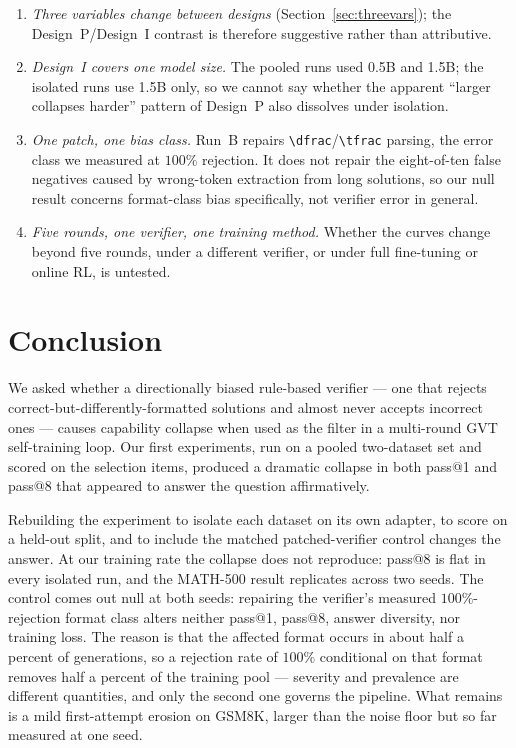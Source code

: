 \documentclass[runningheads]{llncs}
\begin{document}
\begin{enumerate}
points --- including the entire A-versus-B gap --- are below the resolution
of this setup.
\item \emph{Three variables change between designs}
(Section~\ref{sec:threevars}); the Design~P/Design~I contrast is therefore
suggestive rather than attributive.
\item \emph{Design~I covers one model size.} The pooled runs used 0.5B and
1.5B; the isolated runs use 1.5B only, so we cannot say whether the
apparent ``larger collapses harder'' pattern of Design~P also dissolves
under isolation.
\item \emph{One patch, one bias class.} Run~B repairs
\verb|\dfrac|/\verb|\tfrac| parsing, the error class we measured at $100\%$
rejection. It does not repair the eight-of-ten false negatives caused by
wrong-token extraction from long solutions, so our null result concerns
format-class bias specifically, not verifier error in general.
\item \emph{Five rounds, one verifier, one training method.} Whether the
curves change beyond five rounds, under a different verifier, or under full
fine-tuning or online RL, is untested.
\end{enumerate}

\section{Conclusion}
\label{sec:conclusion}

We asked whether a directionally biased rule-based verifier --- one that
rejects correct-but-differently-formatted solutions and almost never
accepts incorrect ones --- causes capability collapse when used as the
filter in a multi-round GVT self-training loop. Our first experiments, run
on a pooled two-dataset set and scored on the selection items, produced a
dramatic collapse in both pass@1 and pass@8 that appeared to answer the
question affirmatively.

Rebuilding the experiment to isolate each dataset on its own adapter, to
score on a held-out split, and to include the matched patched-verifier
control changes the answer. At our training rate the collapse does not
reproduce: pass@8 is flat in every isolated run, and the MATH-500 result
replicates across two seeds.
The control comes out null at both seeds: repairing the verifier's measured
$100\%$-rejection format class alters neither pass@1, pass@8, answer
diversity, nor training loss. The reason is that the affected format occurs
in about half a percent of generations, so a rejection rate of $100\%$
conditional on that format removes half a percent of the training pool ---
severity and prevalence are different quantities, and only the second one
governs the pipeline. What remains is a mild first-attempt erosion on
GSM8K, larger than the noise floor but so far measured at one seed.
\end{document}
